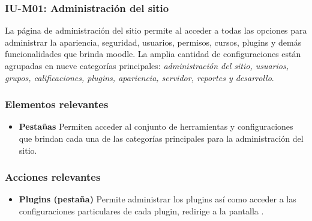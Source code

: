 
\subsubsection{IU-M01: Administración del sitio}

 La página de administración del sitio permite al  acceder a todas las
 opciones para administrar la apariencia, seguridad, usuarios, permisos, cursos, plugins y demás
 funcionalidades que brinda moodle. La amplia cantidad de configuraciones están agrupadas en nueve
 categorías principales: {\it administración del sitio, usuarios, grupos, calificaciones, plugins,
 apariencia, servidor, reportes y desarrollo}.


\subsubsection{Elementos relevantes}

    \begin{itemize}
    \item {\bf Pestañas}
        Permiten acceder al conjunto de herramientas y configuraciones que brindan
        cada una de las categorías principales para la administración del sitio.
    \end{itemize}

\subsubsection{Acciones relevantes}

    \begin{itemize}
    \item {\bf Plugins (pestaña)}
        Permite administrar los plugins así como acceder a las configuraciones particulares de
        cada plugin, redirige a la pantalla .
    \end{itemize}

\clearpage
